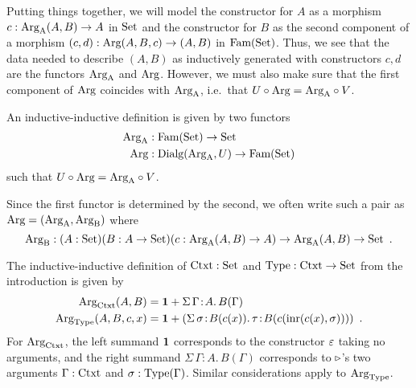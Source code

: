 \documentclass[orivec,envcountsame, ,envcountsect]{llncs}
\begin{document}
Putting things together, we will model the constructor for $A$ as a
morphism $c : \text{Arg}_{\text{A}}(A, B) \to A$ in $\text{Set}$ and the constructor for $B$
as the second component of a morphism $(c, d) : \text{Arg}(A, B, c) \to (A,
B)$ in $\text{Fam}(\text{Set})$. Thus, we see that the data needed to describe $(A,
B)$ as inductively generated with constructors $c, d$ are
the functors $\text{Arg}_{\text{A}}$ and $\text{Arg}$. However, we must also make sure that
the first component of $\text{Arg}$ coincides with $\text{Arg}_{\text{A}}$, i.e.\ that
$U \circ \text{Arg} = \text{Arg}_{\text{A}} \circ V$.
\begin{definition} \label{def:indind-functors}
  An inductive-inductive definition is given by two functors
  \begin{align*}
    \text{Arg}_{\text{A}} &: \text{Fam}(\text{Set}) \to \text{Set} \\
    \text{Arg} &: \text{Dialg}(\text{Arg}_{\text{A}}, U) \to \text{Fam}(\text{Set})
  \end{align*}
  such that $U \circ \text{Arg} = \text{Arg}_{\text{A}} \circ V$.
\end{definition}
%
Since the first functor is determined by the second, we often write
such a pair as $\text{Arg} = (\text{Arg}_{\text{A}}, \text{Arg}_{\text{B}})$ where
\[
 \text{Arg}_{\text{B}} : (A : \text{Set})(B : A \to \text{Set})(c : \text{Arg}_{\text{A}}(A, B) \to A) \to \text{Arg}_{\text{A}}(A, B) \to \text{Set} \enspace .
 \]



\begin{example}
\label{ex:ctxtTy-functor}
The inductive-inductive definition of $\text{Ctxt} : \text{Set}$ and $\text{Type} :
\text{Ctxt} \to \text{Set}$ from the introduction is given by
\begin{align*}
  \text{Arg}_{\text{Ctxt}}(A, B) &= \mathbf{1} + \Sigma\, \Gamma\!:\!A .\, B(\Gamma)\\
  \text{Arg}_{\text{Type}}(A, B, c, x) &= \mathbf{1} + (\Sigma\,  \sigma\!:\! B(c(x)).\, \tau\!:\!B(c(\text{inr}(c(x), \sigma))) ) \enspace .
\end{align*}
For $\text{Arg}_{\text{Ctxt}}$, the left summand $\mathbf{1}$ corresponds to the constructor
$\varepsilon$ taking no arguments, and the right summand $\Sigma\,
\Gamma\!:\!A .\, B(\Gamma)$ corresponds to $ \triangleright $'s two
arguments $\Gamma : \text{Ctxt}$ and $\sigma : \text{Type}(\Gamma)$. Similar
considerations apply to $\text{Arg}_{\text{Type}}$.

\end{example}
\end{document}
